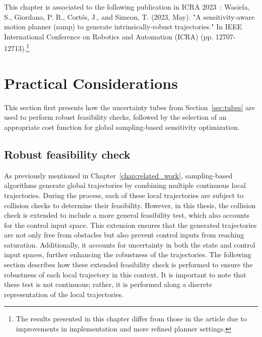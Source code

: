 This chapter is associated to the following publication in ICRA 2023~\cite{cSAMP}: Wasiela, S., Giordano, P. R., Cortés, J., and Simeon, T. (2023, May). "A sensitivity-aware motion planner (samp) to generate intrinsically-robust trajectories." In IEEE International Conference on Robotics and Automation (ICRA) (pp. 12707-12713).\footnote{The results presented in this chapter differ from those in the article due to improvements in implementation and more refined planner settings.}

\section{Practical Considerations}\label{sec:metrics}

This section first presents how the uncertainty tubes from Section~\ref{sec:tubes} are used to perform robust feasibility checks, followed by the selection of an appropriate cost function for global sampling-based sensitivity optimization.

\subsection{Robust feasibility check}\label{sec:robust_CC}

As previously mentioned in Chapter~\ref{chap:related_work}, sampling-based algorithms generate global trajectories by combining multiple continuous local trajectories.
During the process, each of these local trajectories are subject to collision checks to determine their feasibility.
However, in this thesis, the collision check is extended to include a more general feasibility test, which also accounts for the control input space. 
This extension ensures that the generated trajectories are not only free from obstacles but also prevent control inputs from reaching saturation. 
Additionally, it accounts for uncertainty in both the state and control input spaces, further enhancing the robustness of the trajectories.
The following section describes how these extended feasibility check is performed to ensure the robustness of each local trajectory in this context.
It is important to note that these test is not continuous; rather, it is performed along a discrete representation of the local trajectories.

